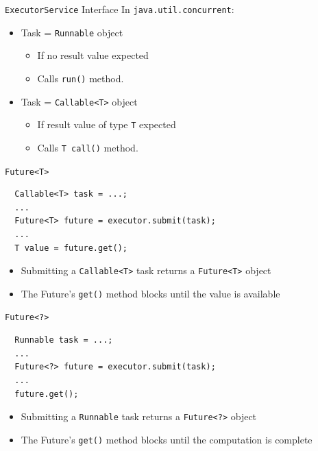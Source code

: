 \begin{frame}{\lstinline!ExecutorService! Interface}
  In \lstinline!java.util.concurrent!:


  \begin{itemize}
  \item Task = \lstinline!Runnable! object
    \begin{itemize}
    \item If no result value expected
    \item Calls \lstinline!run()! method.
    \end{itemize}
  \item Task = \lstinline!Callable<T>! object
    \begin{itemize}
    \item If result value of type \lstinline!T! expected
    \item Calls \lstinline!T call()! method.
    \end{itemize}
  \end{itemize}
\end{frame}

\begin{frame}[fragile]{\lstinline!Future<T>!}
\begin{lstlisting}
  Callable<T> task = ...; 
  ...
  Future<T> future = executor.submit(task);
  ...
  T value = future.get(); 
\end{lstlisting}


  \begin{itemize}
  \item Submitting a \lstinline!Callable<T>! task returns a
    \lstinline!Future<T>! object
  \item The Future's \lstinline!get()! method blocks until the value
    is available
  \end{itemize}
\end{frame}

\begin{frame}[fragile]{\lstinline!Future<?>!}
\begin{lstlisting}
  Runnable task = ...; 
  ...
  Future<?> future = executor.submit(task);
  ...
  future.get(); 
\end{lstlisting}


  \begin{itemize}
  \item Submitting a \lstinline!Runnable! task returns a
    \lstinline!Future<?>! object
  \item The Future's \lstinline!get()! method blocks until the
    computation is complete
  \end{itemize}
\end{frame}

